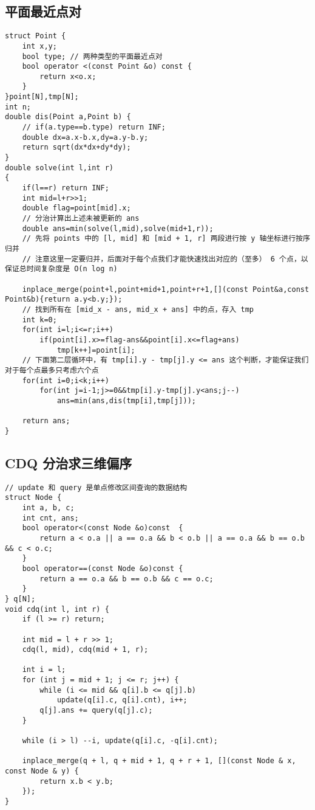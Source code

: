 \subsection{平面最近点对}
\begin{verbatim}
struct Point {
    int x,y;
    bool type; // 两种类型的平面最近点对
    bool operator <(const Point &o) const {
        return x<o.x;
    }
}point[N],tmp[N];
int n;
double dis(Point a,Point b) {
    // if(a.type==b.type) return INF;
    double dx=a.x-b.x,dy=a.y-b.y;
    return sqrt(dx*dx+dy*dy);
}
double solve(int l,int r)
{
    if(l==r) return INF;
    int mid=l+r>>1;
    double flag=point[mid].x;
    // 分治计算出上述未被更新的 ans
    double ans=min(solve(l,mid),solve(mid+1,r));
    // 先将 points 中的 [l, mid] 和 [mid + 1, r] 两段进行按 y 轴坐标进行按序归并
    // 注意这里一定要归并，后面对于每个点我们才能快速找出对应的（至多） 6 个点，以保证总时间复杂度是 O(n log n)

    inplace_merge(point+l,point+mid+1,point+r+1,[](const Point&a,const Point&b){return a.y<b.y;});
    // 找到所有在 [mid_x - ans, mid_x + ans] 中的点，存入 tmp
    int k=0;
    for(int i=l;i<=r;i++)
        if(point[i].x>=flag-ans&&point[i].x<=flag+ans)
            tmp[k++]=point[i];
    // 下面第二层循环中，有 tmp[i].y - tmp[j].y <= ans 这个判断，才能保证我们对于每个点最多只考虑六个点
    for(int i=0;i<k;i++)
        for(int j=i-1;j>=0&&tmp[i].y-tmp[j].y<ans;j--)
            ans=min(ans,dis(tmp[i],tmp[j]));

    return ans;
}
\end{verbatim}


\subsection{CDQ 分治求三维偏序}
\begin{verbatim}
// update 和 query 是单点修改区间查询的数据结构
struct Node {
    int a, b, c;
    int cnt, ans;
    bool operator<(const Node &o)const  {
        return a < o.a || a == o.a && b < o.b || a == o.a && b == o.b && c < o.c;
    }
    bool operator==(const Node &o)const {
        return a == o.a && b == o.b && c == o.c;
    }
} q[N];
void cdq(int l, int r) {
    if (l >= r) return;

    int mid = l + r >> 1;
    cdq(l, mid), cdq(mid + 1, r);

    int i = l;
    for (int j = mid + 1; j <= r; j++) {
        while (i <= mid && q[i].b <= q[j].b)
            update(q[i].c, q[i].cnt), i++; 
        q[j].ans += query(q[j].c);
    }

    while (i > l) --i, update(q[i].c, -q[i].cnt);

    inplace_merge(q + l, q + mid + 1, q + r + 1, [](const Node & x, const Node & y) {
        return x.b < y.b;
    });
}
\end{verbatim}
